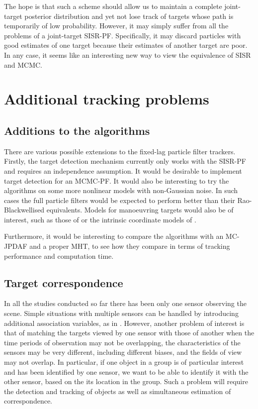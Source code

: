 The hope is that such a scheme should allow us to maintain a complete joint-target posterior distribution and yet not lose track of targets whose path is temporarily of low probability. However, it may simply suffer from all the problems of a joint-target SISR-PF. Specifically, it may discard particles with good estimates of one target because their estimates of another target are poor. In any case, it seems like an interesting new way to view the equivalence of SISR and MCMC.



\section{Additional tracking problems}

\subsection{Additions to the algorithms}
There are various possible extensions to the fixed-lag particle filter trackers. Firstly, the target detection mechanism currently only works with the SISR-PF and requires an independence assumption. It would be desirable to implement target detection for an MCMC-PF. It would also be interesting to try the algorithms on some more nonlinear models with non-Gaussian noise. In such cases the full particle filters would be expected to perform better than their Rao-Blackwellised equivalents. Models for manoeuvring targets would also be of interest, such as those of \cite{Li2003} or the intrinsic coordinate models of \cite{Godsill2007a}.

Furthermore, it would be interesting to compare the algorithms with an MC-JPDAF and a proper MHT, to see how they compare in terms of tracking performance and computation time.



\subsection{Target correspondence}
In all the studies conducted so far there has been only one sensor observing the scene. Simple situations with multiple sensors can be handled by introducing additional association variables, as in \cite{Vermaak2005}. However, another problem of interest is that of matching the targets viewed by one sensor with those of another when the time periods of observation may not be overlapping, the characteristics of the sensors may be very different, including different biases, and the fields of view may not overlap. In particular, if one object in a group is of particular interest and has been identified by one sensor, we want to be able to identify it with the other sensor, based on the its location in the group. Such a problem will require the detection and tracking of objects as well as simultaneous estimation of correspondence.



